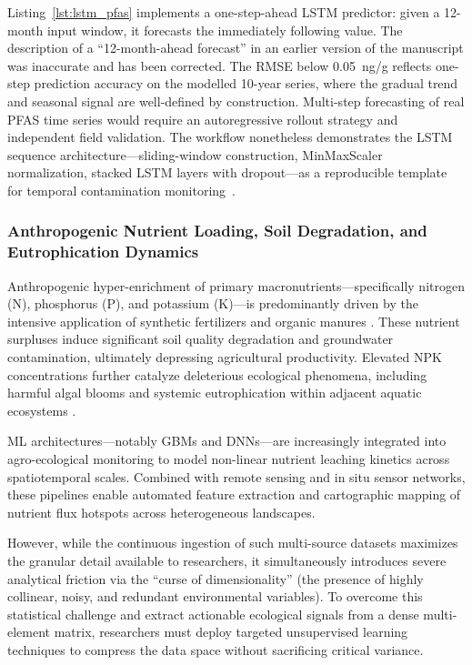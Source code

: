 \documentclass[environremediat,article,accept,pdftex,oneauthor]{Definitions/mdpi}
\begin{document}
{Listing~\ref{lst:lstm_pfas} implements a one-step-ahead LSTM predictor: given a 12-month input window, it forecasts the immediately following value. The description of a ``12-month-ahead forecast'' in an earlier version of the manuscript was inaccurate and has been corrected. The RMSE below 0.05~ng/g reflects one-step prediction accuracy on the modelled 10-year series, where the gradual trend and seasonal signal are well-defined by construction. Multi-step forecasting of real PFAS time series would require an autoregressive rollout strategy and independent field validation. The workflow nonetheless demonstrates the LSTM sequence architecture---sliding-window construction, MinMaxScaler normalization, stacked LSTM layers with dropout---as a reproducible template for temporal contamination monitoring~\cite{Xu2023}.}

\subsubsection{Anthropogenic Nutrient Loading, Soil Degradation, and
    Eutrophication Dynamics}\label{sec2.1.5}

Anthropogenic hyper-enrichment of primary macronutrients---specifically
nitrogen (N), phosphorus (P), and potassium (K)---is predominantly driven by
the intensive application of synthetic fertilizers and organic manures
\cite{Baghaie2020,Luo2017,Hepperly2009}. These nutrient surpluses induce
significant soil quality degradation and groundwater contamination, ultimately
depressing agricultural productivity. Elevated NPK concentrations further
catalyze deleterious ecological phenomena, including harmful algal blooms and
systemic eutrophication within adjacent aquatic ecosystems
\cite{Guan2024,Xu2025}.

{ML architectures---notably GBMs and DNNs---are increasingly integrated into agro-ecological monitoring to model non-linear nutrient leaching kinetics across spatiotemporal scales. Combined with remote sensing and in situ sensor networks, these pipelines enable automated feature extraction and cartographic mapping of nutrient flux hotspots across heterogeneous landscapes.}

However, while the continuous ingestion of such multi-source datasets maximizes the granular detail available to researchers, it simultaneously introduces severe analytical friction via the {``curse of dimensionality''} (the presence of highly collinear, noisy, and redundant environmental variables). To overcome this statistical challenge and extract actionable ecological signals from a dense multi-element matrix, researchers must deploy targeted unsupervised learning techniques to compress the data space without sacrificing critical variance.
\end{document}
